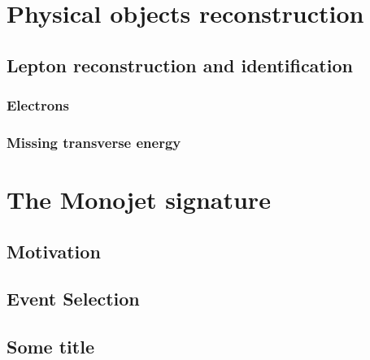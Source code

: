 \documentclass[10pt,twoside,cucitura,classica,english,openany]{toptesi}
\begin{document}


\chapter{Physical objects reconstruction}
\label{cha:phys-objects-reconst}

\section{Lepton reconstruction and identification}
\label{sec:lept-reconstr-ident}



\subsection{Electrons}
\label{sec:electrons}



\subsection{Missing transverse energy}
\label{sec:miss-transv-energy}



\chapter{The Monojet signature}
\label{cha:monojet-signature}

\section{Motivation}
\label{sec:motivation}



\section{Event Selection}
\label{sec:event-selection}



\begin{appendices}
  \chapter{Some title}
\end{appendices}

 \printbibliography
\end{document}
